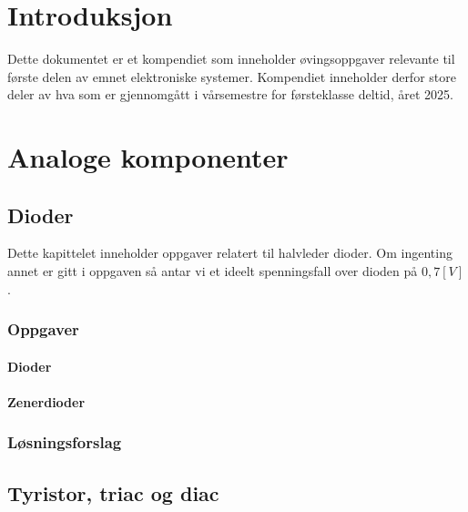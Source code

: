 \documentclass[12pt]{report}
\begin{document}


\tableofcontents
\newpage


\chapter{Introduksjon}
Dette dokumentet er et kompendiet som inneholder øvingsoppgaver relevante til første delen av emnet elektroniske systemer. Kompendiet inneholder derfor store deler av hva som er gjennomgått i vårsemestre for førsteklasse deltid, året 2025.


\chapter{Analoge komponenter}



\section{Dioder}


Dette kapittelet inneholder oppgaver relatert til halvleder dioder. Om ingenting annet er gitt i oppgaven så antar vi et ideelt spenningsfall over dioden på $0,7[V]$.\\

\subsection{Oppgaver}
\subsubsection{Dioder}

\subsubsection{Zenerdioder}


\subsection{Løsningsforslag}
\printsolutions[section]



\newpage

\section{Tyristor, triac og diac}

\printsolutions[section]
\end{document}
